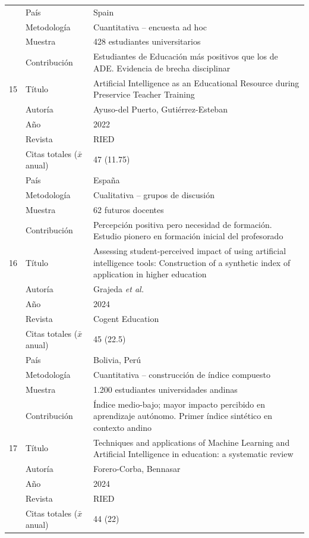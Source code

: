 \documentclass[spanish]{textolivre}
\begin{document}
{\begin{longtable}{@{}p{0.2cm}p{3cm}p{10cm}@{}}
  & País & Spain \\
  & Metodología & Cuantitativa -- encuesta ad hoc  \\
  & Muestra & 428 estudiantes universitarios \\
  & Contribución & Estudiantes de Educación más positivos que los de ADE. Evidencia de brecha disciplinar\\
\midrule
15 & Título  & Artificial Intelligence as an Educational Resource during Preservice Teacher Training\\
  & Autoría & Ayuso-del Puerto, Gutiérrez-Esteban\\
  & Año     & 2022\\
  & Revista & RIED\\
  & Citas totales ($\bar{x}$ anual) & 47 (11.75)\\
  & País & España \\
  & Metodología & Cualitativa -- grupos de discusión \\
  & Muestra & 62 futuros docentes \\
  & Contribución & Percepción positiva pero necesidad de formación. Estudio pionero en formación inicial del profesorado\\
\midrule
16 & Título  & Assessing student-perceived impact of using artificial intelligence tools: Construction of a synthetic index of application in higher education \\
  & Autoría & Grajeda \textit{et al.} \\
  & Año     & 2024\\
  & Revista & Cogent Education\\
  & Citas totales ($\bar{x}$ anual) & 45 (22.5)\\
  & País & Bolivia, Perú \\
  & Metodología &  Cuantitativa -- construcción de índice compuesto\\
  & Muestra & 1.200 estudiantes universidades andinas  \\
  & Contribución & Índice medio-bajo; mayor impacto percibido en aprendizaje autónomo. Primer índice sintético en contexto andino\\
\midrule
17 & Título  & Techniques and applications of Machine Learning and Artificial Intelligence in education: a systematic review \\
  & Autoría & Forero-Corba, Bennasar \\
  & Año     & 2024\\
  & Revista & RIED\\
  & Citas totales ($\bar{x}$ anual) & 44 (22) \\

\end{longtable}}
\end{document}
